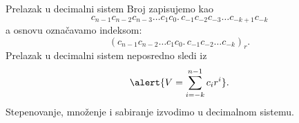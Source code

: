 \begin{frame}[label=04-s005]{Prelazak u decimalni sistem}
Broj zapisujemo kao
\[c_{n-1}c_{n-2}c_{n-3}\ldots c_1c_0.\,c_{-1}c_{-2}c_{-3}\ldots c_{-k+1}c_{-k}\]
a osnovu označavamo indeksom:
\[\left(c_{n-1}c_{n-2}\ldots c_1c_0.\,c_{-1}c_{-2}\ldots c_{-k}\right)_r.\]
Prelazak u decimalni sistem neposredno sledi iz
\[\alert{V=\sum_{i=-k}^{n-1}c_i r^i}.\]
Stepenovanje, množenje i sabiranje izvodimo u decimalnom sistemu.
\end{frame}
